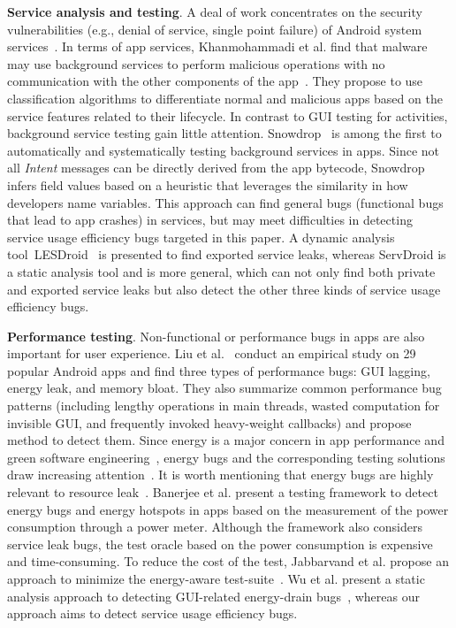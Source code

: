\documentclass[conference]{IEEEtran}
\begin{document}
\textbf{Service analysis and testing}. A deal of work concentrates on the security vulnerabilities (e.g., denial of service, single point failure) of Android system services~\cite{ReavesBGABCDHKS16,HuangZ0015,WangZL16,FengS16,AbualolaAKOM16,LuoZCCLLGYXL17}.
In terms of app services, Khanmohammadi et al. find that malware may use background services to perform malicious operations with no communication with the other components of the app~\cite{KhRH15}. They propose to use classification algorithms to differentiate normal and malicious apps based on the service features related to their lifecycle. In contrast to GUI testing for activities, background service testing gain little attention. \textsf{Snowdrop}~\cite{ZhangLLC17} is among the first to automatically and systematically testing background services in apps. Since not all \textit{Intent} messages can be directly derived from the app bytecode, \textsf{Snowdrop} infers field values based on a heuristic that leverages the similarity in how developers name variables. This approach can find general bugs (functional bugs that lead to app crashes) in services, but may meet difficulties in detecting service usage efficiency bugs targeted in this paper. A dynamic analysis tool~\textsf{LESDroid}~\cite{ma2018} is presented to find exported service leaks, whereas \textsf{ServDroid} is a static analysis tool and is more general, which can not only find both private and exported service leaks but also detect the other three kinds of service usage efficiency bugs.

\textbf{Performance testing}. Non-functional or performance bugs in apps are also important for user experience. Liu et al.~\cite{LiuXC14} conduct an empirical study on 29 popular Android apps and find three types of performance bugs: GUI lagging, energy leak, and memory bloat. They also summarize common performance bug patterns (including lengthy operations in main threads, wasted computation for invisible GUI, and frequently invoked heavy-weight callbacks) and propose method to detect them. Since energy is a major concern in app performance and green software engineering~\cite{PangHAH16,HoqueSKXT16,MBZSJSPC16,0036990}, energy bugs and the corresponding testing solutions draw increasing attention~\cite{GuoZYZZ13,BanerjeeC0R14,LiuXCL14,BehrouzSBM16,WuYR16,JabbarvandM17}.   It is worth mentioning that energy bugs are highly relevant to resource leak~\cite{GuoZYZZ13,BanerjeeC0R14,LiuXCL14,WuYR16}. Banerjee et al. present a testing framework to detect energy bugs and energy hotspots in apps based on the measurement of the power consumption through a power meter. Although the framework also considers service leak bugs, the test oracle based on the power consumption is expensive and time-consuming. To reduce the cost of the test, Jabbarvand et al. propose an approach to minimize the energy-aware test-suite~\cite{BehrouzSBM16}. Wu et al. present a static analysis approach to detecting GUI-related energy-drain bugs~\cite{WuYR16}, whereas our approach aims to detect service usage efficiency bugs.
\end{document}
